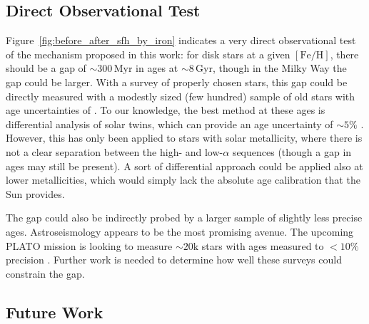 \documentclass[twocolumn,linenumbers,trackchanges]{aastex631}
\newcommand{\Gyr}{\ensuremath{\textrm{Gyr}}}
\newcommand{\Myr}{\ensuremath{\textrm{Myr}}}
\newcommand{\FeH}{\ensuremath{[\textrm{Fe}/\textrm{H}]}}
\begin{document}
\subsection{Direct Observational Test}\label{ssec:obsqui}
Figure~\ref{fig:before_after_sfh_by_iron} indicates a very direct observational test of the mechanism proposed in this work: for disk stars at a given \FeH{}, there should be a gap of $\sim300\,\Myr$ in ages at $\sim8\,\Gyr$, though in the Milky Way the gap could be larger. With a survey of properly chosen stars, this gap could be directly measured with a modestly sized (few hundred) sample of old stars with age uncertainties of . To our knowledge, the best method at these ages is differential analysis of solar twins, which can provide an age uncertainty of $\sim5\%$ \citep[e.g.][]{2014ApJ...795...23B,2018MNRAS.474.2580S}. However, this has only been applied to stars with solar metallicity, where there is not a clear separation between the high- and low-$\alpha$ sequences (though a gap in ages may still be present). A sort of differential approach could be applied also at lower metallicities, which would simply lack the absolute age calibration that the Sun provides.

The gap could also be indirectly probed by a larger sample of slightly less precise ages. Astroseismology appears to be the most promising avenue.  The upcoming PLATO mission is looking to measure $\sim20\textrm{k}$ stars with ages measured to $<10\%$ precision \citep{2024arXiv240605447R}. Further work is needed to determine how well these surveys could constrain the gap.

\subsection{Future Work}\label{ssec:future_work}
\end{document}
